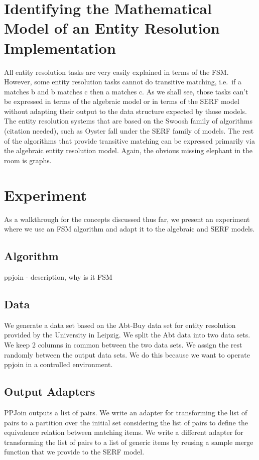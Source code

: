 \documentclass[11pt]{article}
\begin{document}
    \section{Identifying the Mathematical Model of an Entity Resolution Implementation}
    All entity resolution tasks are very easily explained in terms of the FSM\@.
    However, some entity resolution tasks cannot do transitive matching, i.e.\ if a matches b and b matches c then a
    matches c.
    As we shall see, those tasks can't be expressed in terms of the algebraic model or in terms of the SERF model
    without adapting their output to the data structure expected by those models.
    The entity resolution systems that are based on the Swoosh family of algorithms (citation needed), such as Oyster
    fall under the SERF family of models.
    The rest of the algorithms that provide transitive matching can be expressed primarily via the algebraic entity
    resolution model.
    Again, the obvious missing elephant in the room is graphs.

    \section{Experiment}
    As a walkthrough for the concepts discussed thus far, we present an experiment where we use an FSM algorithm and
    adapt it to the algebraic and SERF models.

    \subsection[algo]{Algorithm}
    ppjoin - description, why is it FSM

    \subsection[data]{Data}
    We generate a data set based on the Abt-Buy data set for entity resolution provided by the University in Leipzig.
    We split the Abt data into two data sets.
    We keep 2 columns in common between the two data sets.
    We assign the rest randomly between the output data sets.
    We do this because we want to operate ppjoin in a controlled environment.

    \subsection[adapters]{Output Adapters}
    PPJoin outputs a list of pairs.
    We write an adapter for transforming the list of pairs to a partition over the initial set considering the list of
    pairs to define the equivalence relation between matching items.
    We write a different adapter for transforming the list of pairs to a list of generic items by reusing a sample merge
    function that we provide to the SERF model.
\end{document}
